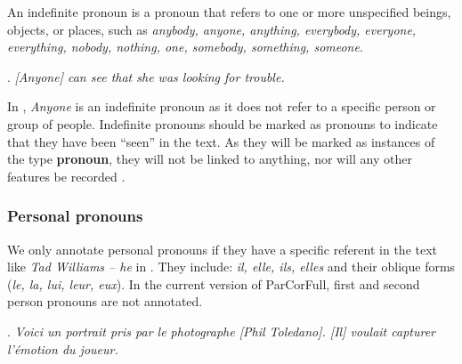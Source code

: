 \documentclass[a4paper]{article}
\begin{document}
An indefinite pronoun is a pronoun that refers to one or more unspecified beings, objects, or places, such as {\sl anybody, anyone, anything, everybody, everyone, everything, nobody, nothing, one, somebody, something, someone}.

\ex. {\sl [Anyone] can see that she was looking for trouble.}

In \Last, {\sl Anyone} is an indefinite pronoun as it does not refer to a specific person or group of people. Indefinite pronouns should be marked as pronouns to indicate that they have been ``seen'' in the text. As they will be marked as instances of the type {\bf pronoun}, they will not be linked to anything, nor will any other features be recorded \cite[p. 9]{GuillouEtAlGuide}.

\subsubsection{Personal pronouns}

We only annotate personal pronouns if they have a specific referent in the text like {\sl Tad Williams -- he} in \Next. %
They include: \textsl{il, elle, ils, elles} and their oblique forms
({\sl le, la, lui, leur, eux}). In the current version of ParCorFull, first and
second person pronouns are not annotated.

\ex.
\textsl{Voici un portrait pris par le photographe [Phil Toledano]. [Il] voulait
capturer l'émotion du joueur.}

\end{document}
